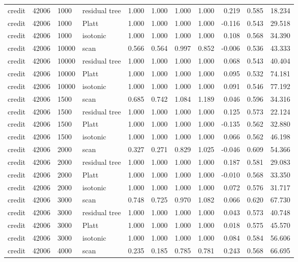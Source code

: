 \begin{tabular}{lrllrrrrrrr}
credit & 42006 & 1000 & residual tree & 1.000 & 1.000 & 1.000 & 1.000 & 0.219 & 0.585 & 18.234 \\
credit & 42006 & 1000 & Platt & 1.000 & 1.000 & 1.000 & 1.000 & -0.116 & 0.543 & 29.518 \\
credit & 42006 & 1000 & isotonic & 1.000 & 1.000 & 1.000 & 1.000 & 0.108 & 0.568 & 34.390 \\
credit & 42006 & 10000 & scan & 0.566 & 0.564 & 0.997 & 0.852 & -0.006 & 0.536 & 43.333 \\
credit & 42006 & 10000 & residual tree & 1.000 & 1.000 & 1.000 & 1.000 & 0.068 & 0.543 & 40.404 \\
credit & 42006 & 10000 & Platt & 1.000 & 1.000 & 1.000 & 1.000 & 0.095 & 0.532 & 74.181 \\
credit & 42006 & 10000 & isotonic & 1.000 & 1.000 & 1.000 & 1.000 & 0.091 & 0.546 & 77.192 \\
credit & 42006 & 1500 & scan & 0.685 & 0.742 & 1.084 & 1.189 & 0.046 & 0.596 & 34.316 \\
credit & 42006 & 1500 & residual tree & 1.000 & 1.000 & 1.000 & 1.000 & 0.125 & 0.573 & 22.124 \\
credit & 42006 & 1500 & Platt & 1.000 & 1.000 & 1.000 & 1.000 & -0.135 & 0.562 & 32.880 \\
credit & 42006 & 1500 & isotonic & 1.000 & 1.000 & 1.000 & 1.000 & 0.066 & 0.562 & 46.198 \\
credit & 42006 & 2000 & scan & 0.327 & 0.271 & 0.829 & 1.025 & -0.046 & 0.609 & 54.366 \\
credit & 42006 & 2000 & residual tree & 1.000 & 1.000 & 1.000 & 1.000 & 0.187 & 0.581 & 29.083 \\
credit & 42006 & 2000 & Platt & 1.000 & 1.000 & 1.000 & 1.000 & -0.010 & 0.568 & 33.350 \\
credit & 42006 & 2000 & isotonic & 1.000 & 1.000 & 1.000 & 1.000 & 0.072 & 0.576 & 31.717 \\
credit & 42006 & 3000 & scan & 0.748 & 0.725 & 0.970 & 1.082 & 0.066 & 0.620 & 67.730 \\
credit & 42006 & 3000 & residual tree & 1.000 & 1.000 & 1.000 & 1.000 & 0.043 & 0.573 & 40.748 \\
credit & 42006 & 3000 & Platt & 1.000 & 1.000 & 1.000 & 1.000 & 0.018 & 0.575 & 45.570 \\
credit & 42006 & 3000 & isotonic & 1.000 & 1.000 & 1.000 & 1.000 & 0.084 & 0.584 & 56.606 \\
credit & 42006 & 4000 & scan & 0.235 & 0.185 & 0.785 & 0.781 & 0.243 & 0.568 & 66.695 \\

\end{tabular}
